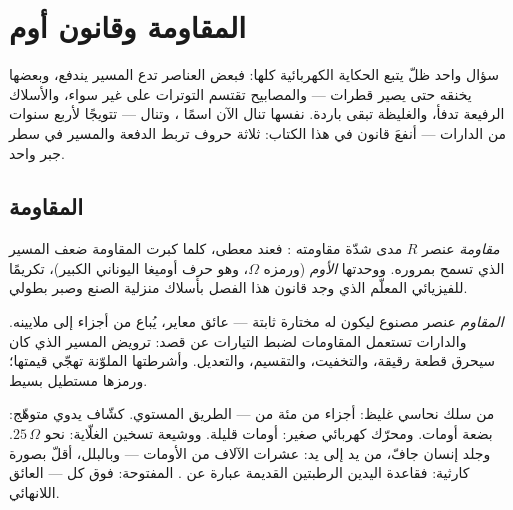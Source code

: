 \chapter{المقاومة وقانون أوم}\label{ch:g8:ohms-law}

سؤال واحد ظلّ يتبع الحكاية الكهربائية كلها: فبعض العناصر تدع
المسير يندفع، وبعضها يخنقه حتى يصير قطرات --- والمصابيح تقتسم
التوترات على غير سواء، والأسلاك الرفيعة تدفأ، والغليظة تبقى
باردة.  نفسها تنال الآن اسمًا ، وتنال ---
تتويجًا لأربع سنوات من الدارات --- أنفعَ قانون في هذا الكتاب:
ثلاثة حروف تربط الدفعة والمسير  في سطر جبر واحد.

\section{المقاومة}

\begin{definition}[المقاومة]\label{def:g8:ohms-law:resistance}
\emph{مقاومة} عنصر $R$  مدى شدّة مقاومته
: فعند  معطى، كلما كبرت المقاومة ضعف
المسير الذي تسمح بمروره. ووحدتها \emph{الأوم}
(ورمزه $\Omega$، وهو حرف أوميغا اليوناني الكبير)، تكريمًا
للفيزيائي المعلّم الذي وجد قانون هذا الفصل بأسلاك منزلية الصنع
وصبر بطولي.
\end{definition}

\begin{definition}[المقاوم]\label{def:g8:ohms-law:resistor}
\emph{المقاوم} عنصر مصنوع ليكون له  مختارة
ثابتة --- عائق معاير، يُباع من أجزاء  إلى ملايينه.
والدارات تستعمل المقاومات لضبط التيارات عن قصد: ترويض المسير
الذي كان سيحرق قطعة رقيقة، والتخفيت، والتقسيم، والتعديل.
وأشرطتها الملوّنة تهجّي قيمتها؛ ورمزها مستطيل بسيط.
\end{definition}

\begin{example}\label{ex:g8:ohms-law:values}
 من سلك نحاسي غليظ: أجزاء من مئة من  --- الطريق
المستوي.  كشّاف يدوي متوهّج: بضعة أومات. ومحرّك كهربائي
صغير: أومات قليلة. ووشيعة تسخين الغلّاية: نحو $25\,\Omega$.
وجلد إنسان جافّ، من يد إلى يد: عشرات الآلاف من الأومات ---
وبالبلل، أقلّ بصورة كارثية: فقاعدة اليدين الرطبتين القديمة
عبارة عن .  المفتوحة:  فوق كل  ---
العائق اللانهائي.
\end{example}

